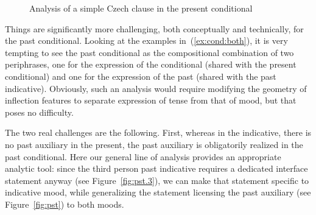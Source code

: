 \documentclass[output=paper]{langsci/langscibook}
\begin{document}
\begin{figure}[p]
\caption{Analysis of a simple  Czech clause in the present conditional\label{fig:ana:cond}}
\end{figure}

Things are significantly more challenging, both conceptually and technically, for the past conditional. Looking at the examples in~(\ref{ex:cond:both}), it is very tempting to see the past conditional as the compositional combination of two periphrases, one for the expression of the conditional (shared with the present conditional) and one for the expression of the past (shared with the past indicative). Obviously, such an analysis would require modifying the geometry of inflection features to separate expression of tense from that of mood, but that poses no difficulty. 

The  two real challenges are the following. First, whereas in the indicative, there is no past auxiliary in the present, the past auxiliary is obligatorily realized in the past conditional. Here our general line of analysis provides an appropriate analytic tool: since the third person past indicative requires a dedicated interface statement anyway (see Figure~\ref{fig:pst.3}), we can make that statement specific to indicative mood, while generalizing the statement licensing the past auxiliary (see Figure~\ref{fig:pst}) to both moods. 
\end{document}

